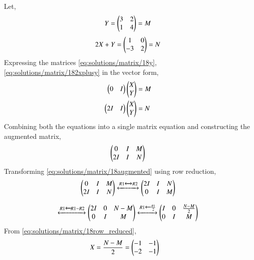 Let,
\begin{align} \label{eq:solutions/matrix/18y}
    Y = \begin{pmatrix} 3 & 2 \\ 1 & 4 \end{pmatrix} = M 
\end{align}
\begin{align} \label{eq:solutions/matrix/182xplusy}
    2X+ Y = \begin{pmatrix}1 & 0 \\ -3 & 2\end{pmatrix} = N
\end{align}
Expressing the matrices \eqref{eq:solutions/matrix/18y}, \eqref{eq:solutions/matrix/182xplusy} in the vector form, 
\begin{align}
    \begin{pmatrix}0 & I \end{pmatrix}\begin{pmatrix}X \\Y\end{pmatrix} &= M \\
    \begin{pmatrix}2I & I\end{pmatrix}\begin{pmatrix}X \\ Y\end{pmatrix} &= N
\end{align}
Combining both the equations into a single matrix equation and constructing the augmented matrix, 
\begin{align} \label{eq:solutions/matrix/18augmented}
    \begin{pmatrix}0 & I & M \\ 2I & I &  N\end{pmatrix}
\end{align}
Transforming \eqref{eq:solutions/matrix/18augmented} using row reduction, 
\begin{align}
    \begin{pmatrix}0 & I & M \\ 2I & I &  N\end{pmatrix} \xleftrightarrow[]{R1\xleftrightarrow{}R2}\begin{pmatrix}2I & I & N\\ 0 & I & M\end{pmatrix}
\end{align}

\begin{align} \label{eq:solutions/matrix/18row_reduced}
    \xleftrightarrow{R1 \xleftarrow[]{} R1-R2}\begin{pmatrix}2I & 0 & N-M \\ 0 & I & M\end{pmatrix} \xleftrightarrow{R1 \xleftarrow[]{} \frac{R1}{2}} \begin{pmatrix}I & 0 & \frac{N-M}{2} \\ 0 & I & M \end{pmatrix}
\end{align}
From \eqref{eq:solutions/matrix/18row_reduced}, 
\begin{align}
    X = \frac{ N -M }{2} &= \begin{pmatrix}-1 & -1 \\ -2 & -1\end{pmatrix}
\end{align}

